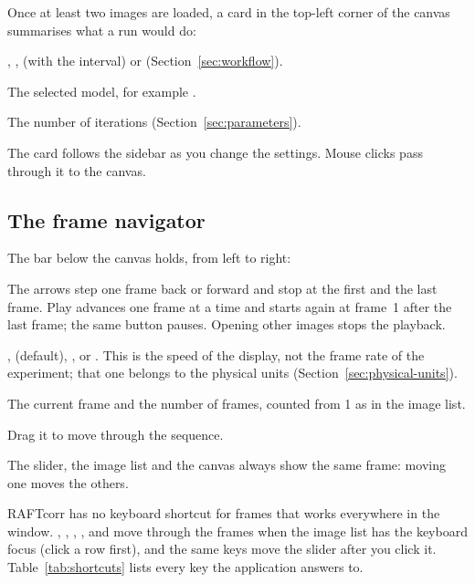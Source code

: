 Once at least two images are loaded, a card in the top-left corner of the canvas summarises what
a run would do:
\begin{description}[leftmargin=1.2cm,style=nextline]
  \item[MODE] , ,  (with the
    interval) or  (Section~\ref{sec:workflow}).
  \item[MODEL] The selected model, for example .
  \item[ITERATIONS] The number of iterations (Section~\ref{sec:parameters}).
\end{description}
The card follows the sidebar as you change the settings. Mouse clicks pass through it to the
canvas.

\subsection{The frame navigator}

The bar below the canvas holds, from left to right:
\begin{description}[leftmargin=1.2cm,style=nextline]
  \item[Previous frame, Play animation, Next frame]
    The arrows step one frame back or forward and stop at the first and the last frame. Play
    advances one frame at a time and starts again at frame~1 after the last frame; the same
    button pauses. Opening other images stops the playback.
  \item[Playback speed]
    ,  (default), ,  or . This is
    the speed of the display, not the frame rate of the experiment; that one belongs to the
    physical units (Section~\ref{sec:physical-units}).
  \item[FRAME n/N]
    The current frame and the number of frames, counted from 1 as in the image list.
  \item[Slider]
    Drag it to move through the sequence.
\end{description}
The slider, the image list and the canvas always show the same frame: moving one moves the
others.

RAFTcorr has no keyboard shortcut for frames that works everywhere in the window. ,
, , ,  and  move through the frames when
the image list has the keyboard focus (click a row first), and the same keys move the slider after
you click it. Table~\ref{tab:shortcuts} lists every key the application answers to.
